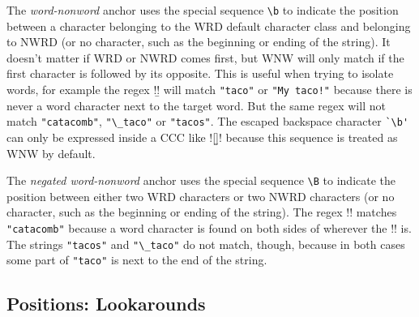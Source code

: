 \begin{description} \itemsep -1pt

\item[WNW:] The \emph{word-nonword} anchor uses the special sequence \verb!\b! to indicate the position between a character belonging to the WRD default character class and belonging to NWRD (or no character, such as the beginning or ending of the string).  It doesn't matter if WRD or NWRD comes first, but WNW will only match if the first character is followed by its opposite.  This is useful when trying to isolate words, for example the regex \cverb!\btaco\b! will match \verb!"taco"! or \verb|"My taco!"|  because there is never a word character next to the target word.  But the same regex will not match \verb!"catacomb"!, \verb!"\_taco"! or \verb!"tacos"!.  The escaped backspace character \verb!`\b'! can only be expressed inside a CCC like \cverb![\b]! because this sequence is treated as WNW by default.

\item[NWNW:] The \emph{negated word-nonword} anchor uses the special sequence \verb!\B! to indicate the position between either two WRD characters or two NWRD characters (or no character, such as the beginning or ending of the string).  The regex \cverb!\Btaco\B! matches \verb!"catacomb"! because a word character is found on both sides of wherever the \cverb!\B! is.  The strings \verb!"tacos"! and \verb!"\_taco"! do not match, though, because in both cases some part of \verb!"taco"! is next to the end of the string.
\end{description}

\subsection*{Positions: Lookarounds}

